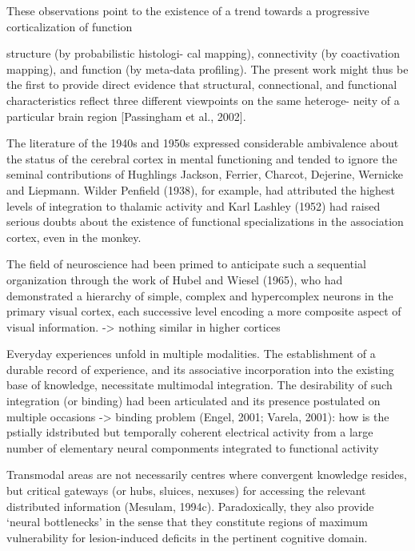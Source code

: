 \documentclass[authoryear,review,3p]{elsarticle}
\begin{document}
These observations point to the existence of a trend towards a progressive corticalization of function

structure (by probabilistic histologi- cal mapping), connectivity (by coactivation mapping), and function (by meta-data profiling). The present work might thus be the first to provide direct evidence that structural, connectional, and functional characteristics reflect three different viewpoints on the same heteroge- neity of a particular brain region [Passingham et al., 2002].

The literature of the 1940s and 1950s expressed considerable ambivalence about the status of the cerebral cortex in mental functioning and tended to ignore the seminal contributions of Hughlings Jackson, Ferrier, Charcot, Dejerine, Wernicke and Liepmann. Wilder Penfield (1938), for example, had attributed the highest levels of integration to thalamic activity and Karl Lashley (1952) had raised serious doubts about the existence of functional specializations in the association cortex, even in the monkey.

The field of neuroscience had been primed to anticipate such a sequential organization through the work of Hubel and Wiesel (1965), who had demonstrated a hierarchy of simple, complex and hypercomplex neurons in the primary visual cortex, each successive level encoding a more composite aspect of visual information.
-> nothing similar in higher cortices



Everyday experiences unfold in multiple modalities. The establishment of a durable record of experience, and its associative incorporation into the existing base of knowledge, necessitate multimodal integration. The desirability of such integration (or binding) had been articulated and its presence postulated on multiple occasions
-> binding problem (Engel, 2001; Varela, 2001):
how is the pstially idstributed but temporally coherent electrical activity
from a large number of elementary neural componments integrated to functional activity

Transmodal areas are not necessarily centres where convergent knowledge resides, but critical gateways (or hubs, sluices, nexuses) for accessing the relevant distributed information (Mesulam, 1994c). Paradoxically, they also provide ‘neural bottlenecks’ in the sense that they constitute regions of maximum vulnerability for lesion-induced deficits in the pertinent cognitive domain.
\end{document}

